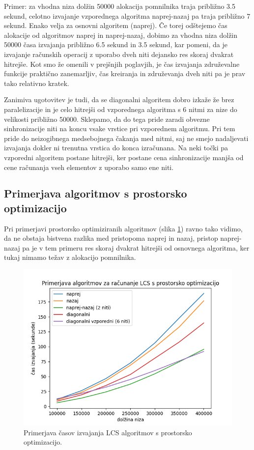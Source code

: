\documentclass[a4paper,12pt,openright]{book}
\begin{document}
 Primer: za vhodna niza dolžin 50000 alokacija pomnilnika traja približno 3.5 sekund, celotno izvajanje vzporednega algoritma naprej-nazaj pa traja približno 7 sekund. Enako velja za osnovni algoritem (naprej). Če torej odštejemo čas alokacije od algoritmov naprej in naprej-nazaj, dobimo za vhodna niza dolžin 50000 časa izvajanja približno 6.5 sekund in 3.5 sekund, kar pomeni, da je izvajanje računskih operacij z uporabo dveh niti dejansko res skoraj dvakrat hitrejše. Kot smo že omenili v prejšnjih poglavjih, je čas izvajanja združevalne funkcije praktično zanemarljiv, čas kreiranja in združevanja dveh niti pa je prav tako relativno kratek. 

Zanimiva ugotovitev je tudi, da se diagonalni algoritem dobro izkaže že brez paralelizacije in je celo hitrejši od vzporednega algoritma s 6 nitmi za nize do velikosti približno 50000. Sklepamo, da do tega pride zaradi obvezne sinhronizacije niti na koncu vsake vrstice pri vzporednem algoritmu. Pri tem pride do neizogibnega medsebojnega čakanja med nitmi, saj ne smejo nadaljevati izvajanja dokler ni trenutna vrstica do konca izračunana. Na neki točki pa vzporedni algoritem postane hitrejši, ker postane cena sinhronizacije manjša od cene računanja vseh elementov z uporabo samo ene niti. 

\subsection{Primerjava algoritmov s prostorsko optimizacijo}

Pri primerjavi prostorsko optimiziranih algoritmov (slika \ref{comparison2}) ravno tako vidimo, da ne obstaja bistvena razlika med pristopoma naprej in nazaj, pristop naprej-nazaj pa je v tem primeru res skoraj dvakrat hitrejši od osnovnega algoritma, ker tukaj nimamo težav z alokacijo pomnilnika. 

\begin{figure}[htb]
\centering
\includegraphics[width=1.0\textwidth]{plots/LCSspace.png}
\caption{Primerjava časov izvajanja LCS algoritmov s prostorsko optimizacijo.}
\label{comparison2}
\end{figure}
\end{document}
